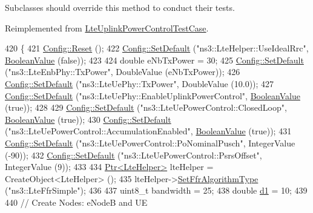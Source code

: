 Subclasses should override this method to conduct their tests. 

Reimplemented from \hyperlink{classLteUplinkPowerControlTestCase_ade34c47524d78d2154c15ba6c257a581}{Lte\+Uplink\+Power\+Control\+Test\+Case}.


\begin{DoxyCode}
420 \{
421   \hyperlink{group__config_ga2c1b65724f42f8c72276d7e7ad6df6db}{Config::Reset} ();
422   \hyperlink{group__config_ga2e7882df849d8ba4aaad31c934c40c06}{Config::SetDefault} (\textcolor{stringliteral}{"ns3::LteHelper::UseIdealRrc"}, 
      \hyperlink{classns3_1_1BooleanValue}{BooleanValue} (\textcolor{keyword}{false}));
423 
424   \textcolor{keywordtype}{double} eNbTxPower = 30;
425   \hyperlink{group__config_ga2e7882df849d8ba4aaad31c934c40c06}{Config::SetDefault} (\textcolor{stringliteral}{"ns3::LteEnbPhy::TxPower"}, DoubleValue (eNbTxPower));
426   \hyperlink{group__config_ga2e7882df849d8ba4aaad31c934c40c06}{Config::SetDefault} (\textcolor{stringliteral}{"ns3::LteUePhy::TxPower"}, DoubleValue (10.0));
427   \hyperlink{group__config_ga2e7882df849d8ba4aaad31c934c40c06}{Config::SetDefault} (\textcolor{stringliteral}{"ns3::LteUePhy::EnableUplinkPowerControl"}, 
      \hyperlink{classns3_1_1BooleanValue}{BooleanValue} (\textcolor{keyword}{true}));
428 
429   \hyperlink{group__config_ga2e7882df849d8ba4aaad31c934c40c06}{Config::SetDefault} (\textcolor{stringliteral}{"ns3::LteUePowerControl::ClosedLoop"}, 
      \hyperlink{classns3_1_1BooleanValue}{BooleanValue} (\textcolor{keyword}{true}));
430   \hyperlink{group__config_ga2e7882df849d8ba4aaad31c934c40c06}{Config::SetDefault} (\textcolor{stringliteral}{"ns3::LteUePowerControl::AccumulationEnabled"}, 
      \hyperlink{classns3_1_1BooleanValue}{BooleanValue} (\textcolor{keyword}{true}));
431   \hyperlink{group__config_ga2e7882df849d8ba4aaad31c934c40c06}{Config::SetDefault} (\textcolor{stringliteral}{"ns3::LteUePowerControl::PoNominalPusch"}, IntegerValue (-90));
432   \hyperlink{group__config_ga2e7882df849d8ba4aaad31c934c40c06}{Config::SetDefault} (\textcolor{stringliteral}{"ns3::LteUePowerControl::PsrsOffset"}, IntegerValue (9));
433 
434   \hyperlink{classns3_1_1Ptr}{Ptr<LteHelper>} lteHelper = CreateObject<LteHelper> ();
435   lteHelper->\hyperlink{classns3_1_1LteHelper_a035c6b03305c1511975362f80425b5fc}{SetFfrAlgorithmType} (\textcolor{stringliteral}{"ns3::LteFfrSimple"});
436 
437   uint8\_t bandwidth = 25;
438   \textcolor{keywordtype}{double} \hyperlink{lte__link__budget__interference_8m_ab5ca0c44c6f0a063a5219b3749db661f}{d1} = 10;
439 
440   \textcolor{comment}{// Create Nodes: eNodeB and UE}

\end{DoxyCode}
